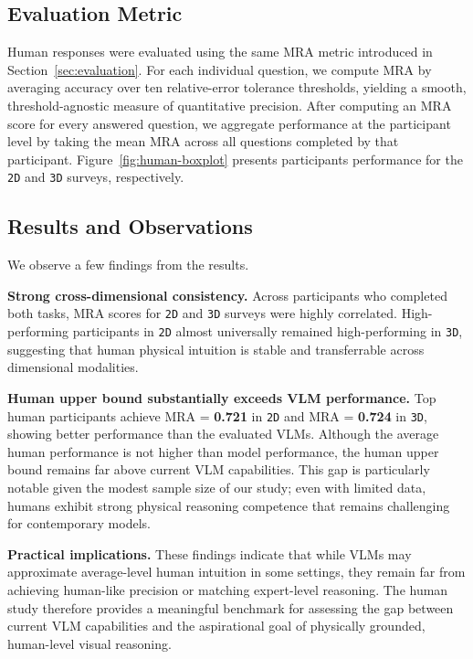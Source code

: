 \subsection{Evaluation Metric}
Human responses were evaluated using the same MRA metric introduced in Section~\ref{sec:evaluation}. 
For each individual question, we compute MRA by averaging accuracy over ten relative-error tolerance thresholds, yielding a smooth, threshold-agnostic measure of quantitative precision. 
After computing an MRA score for every answered question, we aggregate performance at the participant level by taking the mean MRA across all questions completed by that participant. 
Figure~\ref{fig:human-boxplot} presents participants performance for the \texttt{2D} and \texttt{3D} surveys, respectively.


\subsection{Results and Observations}
We observe a few findings from the results.

\noindent\textbf{Strong cross-dimensional consistency.}
Across participants who completed both tasks, MRA scores for \texttt{2D} and \texttt{3D} surveys were highly correlated. High-performing participants in \texttt{2D} almost universally remained high-performing in \texttt{3D}, suggesting that human physical intuition is stable and transferrable across dimensional modalities.


\noindent\textbf{Human upper bound substantially exceeds VLM performance.}
Top human participants achieve MRA = \textbf{0.721} in \texttt{2D} and  MRA = \textbf{0.724} in \texttt{3D}, showing better performance than the evaluated VLMs. Although the average human performance is not higher than model performance, the human upper bound remains far above current VLM capabilities. This gap is particularly notable given the modest sample size of our study; even with limited data, humans exhibit strong physical reasoning competence that remains challenging for contemporary models.


\noindent\textbf{Practical implications.}
These findings indicate that while VLMs may approximate average-level human intuition in some settings, they remain far from achieving human-like precision or matching expert-level reasoning. The human study therefore provides a meaningful benchmark for assessing the gap between current VLM capabilities and the aspirational goal of physically grounded, human-level visual reasoning.

